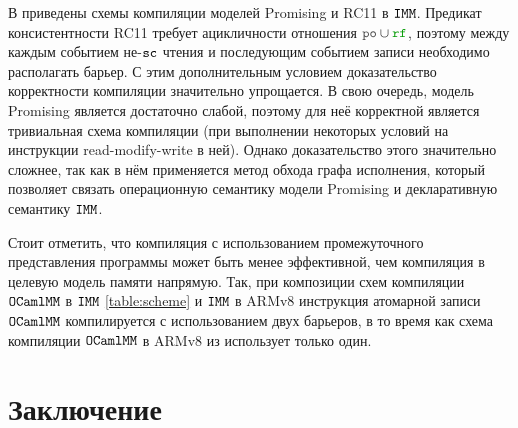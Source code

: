 В \cite{imm} приведены схемы компиляции моделей  Promising \cite{promising} и RC11 \cite{rc11} в $\mathtt{IMM}$. Предикат консистентности RC11 требует ацикличности отношения $\lPO \cup \lRF$, поэтому между каждым событием не-${\mathtt{sc}}$ чтения и последующим событием записи необходимо располагать барьер. С этим дополнительным условием доказательство корректности компиляции значительно упрощается. В свою очередь, модель Promising является достаточно слабой, поэтому для неё корректной является тривиальная схема компиляции (при выполнении некоторых условий на инструкции read-modify-write в ней). Однако доказательство этого значительно сложнее, так как в нём применяется метод обхода графа исполнения, который позволяет связать операционную семантику модели Promising и декларативную семантику $\mathtt{IMM}$.

Стоит отметить, что компиляция с использованием промежуточного представления программы может быть менее эффективной, чем компиляция в целевую модель памяти напрямую. Так, при композиции схем компиляции $\mathtt{OCaml}\allowbreak \mathtt{MM}$ в $\mathtt{IMM}$ \ref{table:scheme} и $\mathtt{IMM}$ в ARMv8 \cite{imm-sc} инструкция атомарной записи $\mathtt{OCaml}\allowbreak \mathtt{MM}$ компилируется с использованием двух барьеров, в то время как схема компиляции $\mathtt{OCaml}\allowbreak \mathtt{MM}$ в ARMv8 из \cite{omm} использует только один. 

\section{Заключение}
\label{future-work}



